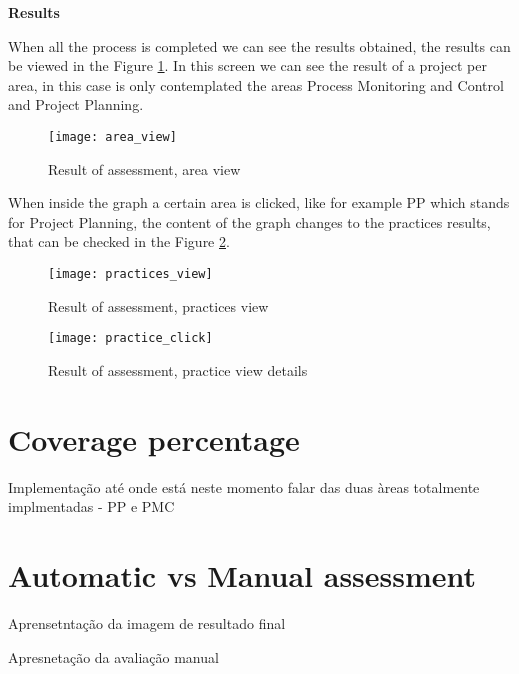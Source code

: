 \vspace{10 mm}

\textbf{Results}

When all the process is completed we can see the results obtained, the results can be viewed in the Figure \ref{fig:area_view}. In this screen we can see the result of a project per area, in this case is only contemplated the areas Process Monitoring and Control and Project Planning.

\begin{figure}[h]
	\begin{center}
		\leavevmode
		\texttt{[image: area\_view]}
		\caption{Result of assessment, area view}
		\label{fig:area_view}
	\end{center}
\end{figure}

When inside the graph a certain area is clicked, like for example PP which stands for Project Planning, the content of the graph changes to the practices results, that can be checked in the Figure \ref{fig:practices_view}.


\begin{figure}[h]
	\begin{center}
		\leavevmode
		\texttt{[image: practices\_view]}
		\caption{Result of assessment, practices view}
		\label{fig:practices_view}
	\end{center}
\end{figure}



\begin{figure}[h]
	\begin{center}
		\leavevmode
		\texttt{[image: practice\_click]}
		\caption{Result of assessment, practice view details}
		\label{fig:practice_click}
	\end{center}
\end{figure}

\section{Coverage percentage} \label{sec:coverage}


Implementação até onde está neste momento falar das duas àreas totalmente implmentadas - PP e PMC
	
\section{Automatic vs Manual assessment} \label{sec:automatic}

Aprensetntação da imagem de resultado final

Apresnetação da avaliação manual